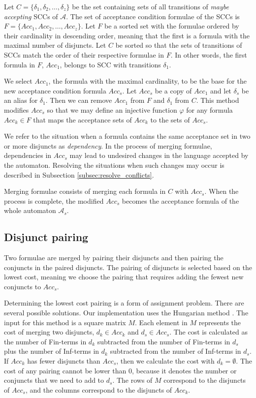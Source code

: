 \documentclass[
  digital, %
  twoside, %
  table,   %
  lof,     %
  lot,     %
]{fithesis3}
\begin{document}
Let $C = \{\delta_1, \delta_2, \dots, \delta_z\}$ be the set containing sets of all transitions of \emph{maybe accepting} SCCs of $\mathcal{A}$. The set of acceptance condition formulae of the SCCs is $F = \{Acc_1, Acc_2, \dots, Acc_z\}$. Let $F$ be a sorted set with the formulae ordered by their cardinality in descending order, meaning that the first is a formula with the maximal number of disjuncts. Let $C$ be sorted so that the sets of transitions of SCCs match the order of their respective formulae in $F$. In other words, the first formula in $F$, $Acc_1$, belongs to SCC with transitions $\delta_1$.

We select $Acc_1$, the formula with the maximal cardinality, to be the base for the new acceptance condition formula $Acc_s$. Let $Acc_s$ be a copy of $Acc_1$ and let $\delta_s$ be an alias for $\delta_1$. Then we can remove $Acc_1$ from $F$ and $\delta_1$ from $C$. This method modifies $Acc_s$ so that we may define an injective function $\varphi$ for any formula $Acc_k \in F$ that maps the acceptance sets of $Acc_k$ to the sets of $Acc_s$. 

We refer to the situation when a formula contains the same acceptance set in two or more disjuncts as \emph{dependency}. In the process of merging formulae, dependencies in $Acc_s$ may lead to undesired changes in the language accepted by the automaton. Resolving the situations when such changes may occur is described in Subsection \ref{subsec:resolve_conflicts}. 

Merging formulae consists of merging each formula in $C$ with $Acc_s$. When the process is complete, the modified $Acc_s$ becomes the acceptance formula of the whole automaton $\mathcal{A}_s$.

\subsection{Disjunct pairing}
Two formulae are merged by pairing their disjuncts and then pairing the conjuncts in the paired disjuncts. The pairing of disjuncts is selected based on the lowest cost, meaning we choose the pairing that requires adding the fewest new conjuncts to $Acc_s$. 

Determining the lowest cost pairing is a form of assignment problem. There are several possible solutions. Our implementation uses the Hungarian method \cite{hungarian_method}. The input for this method is a square matrix $M$. Each element in $M$ represents the cost of merging two disjuncts, $d_k \in Acc_k$ and $d_s \in Acc_s$. The cost is calculated as the number of Fin-terms in $d_k$ subtracted from the number of Fin-terms in $d_s$ plus the number of Inf-terms in $d_k$ subtracted from the number of Inf-terms in $d_s$. If $Acc_k$ has fewer disjuncts than $Acc_s$, then we calculate the cost with $d_k = \emptyset$. The cost of any pairing cannot be lower than 0, because it denotes the number or conjuncts that we need to add to $d_s$. The rows of $M$ correspond to the disjuncts of $Acc_s$, and the columns correspond to the disjuncts of $Acc_k$.
\end{document}
